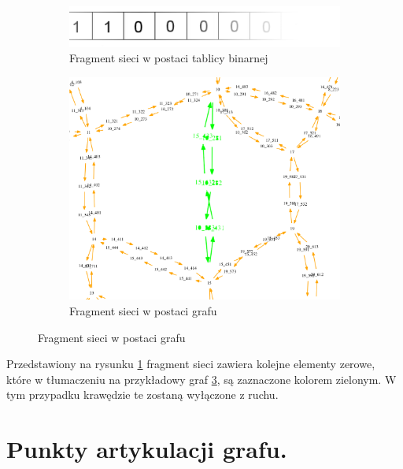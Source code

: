 \documentclass[twoside,12pt]{report}
\begin{document}
\begin{figure}[ht]
\begin{flushleft}
	\begin{subfigure}[c]{.47\textwidth}
	\vspace*{80px}
	\centering
	\includegraphics[width=\textwidth]{img/bool}
	\caption{Fragment sieci w postaci tablicy binarnej }
	\label{left-example}
\end{subfigure}%
\end{flushleft}
\begin{flushright}
	\begin{subfigure}[c]{.47\textwidth}
	\centering
	\includegraphics[width=\textwidth]{img/bool-efect}
	\caption{Fragment sieci w postaci grafu}
	\label{right-example}
	\end{subfigure}
\end{flushright}
\end{figure}

Przedstawiony na rysunku \ref{left-example} fragment sieci zawiera kolejne elementy zerowe, które w tłumaczeniu na przykładowy graf \ref{right-example}, są zaznaczone kolorem zielonym. W tym przypadku krawędzie te zostaną wyłączone z ruchu. 

\section{Punkty artykulacji grafu.}
\end{document}
